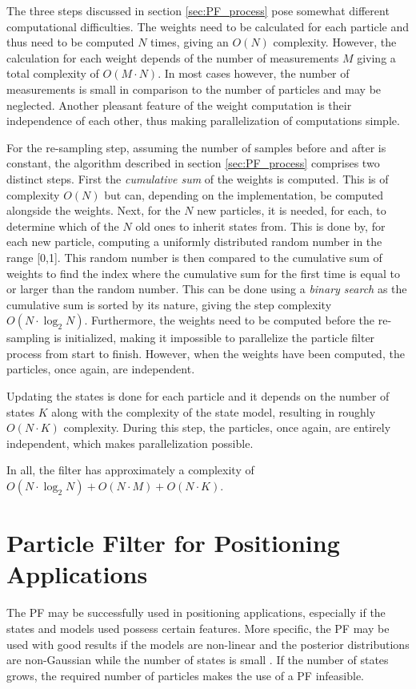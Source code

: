 \documentclass{LTHthesis}
\begin{document}
The three steps discussed in section \ref{sec:PF_process} pose somewhat different computational difficulties. The weights need to be calculated for each particle and thus need to be computed $N$ times, giving an $O(N)$ complexity. However, the calculation for each weight depends of the number of measurements $M$ giving a total complexity of $O(M\cdot N)$. In most cases however, the number of measurements is small in comparison to the number of particles and may be neglected. Another pleasant feature of the weight computation is their independence of each other, thus making parallelization of computations simple.

For the re-sampling step, assuming the number of samples before and after is constant, the algorithm described in section \ref{sec:PF_process} comprises two distinct steps. First the \emph{cumulative sum} of the weights is computed. This is of complexity $O(N)$ but can, depending on the implementation, be computed alongside the weights. Next, for the $N$ new particles, it is needed, for each, to determine which of the $N$ old ones to inherit states from. This is done by, for each new particle, computing a uniformly distributed random number in the range [0,1]. This random number is then compared to the cumulative sum of weights to find the index where the cumulative sum for the first time is equal to or larger than the random number. This can be done using a \emph{binary search} as the cumulative sum is sorted by its nature, giving the step complexity $O(N\cdot\log_2{N})$. Furthermore, the weights need to be computed before the re-sampling is initialized, making it impossible to parallelize the particle filter process from start to finish. However, when the weights have been computed, the particles, once again, are independent. 

Updating the states is done for each particle and it depends on the number of states $K$ along with the complexity of the state model, resulting in roughly $O(N \cdot K)$ complexity. During this step, the particles, once again, are entirely independent, which makes parallelization possible.

In all, the filter has approximately a complexity of $O(N\cdot\log_2{N}) + O(N\cdot M) + O(N\cdot K)$.
%
\section{Particle Filter for Positioning Applications}
%
The PF may be successfully used in positioning applications, especially if the states and models used possess certain features. More specific, the PF may be used with good results if the models are non-linear and the posterior distributions are non-Gaussian while the number of states is small \cite{gson12}. If the number of states grows, the required number of particles makes the use of a PF infeasible.
\end{document}
